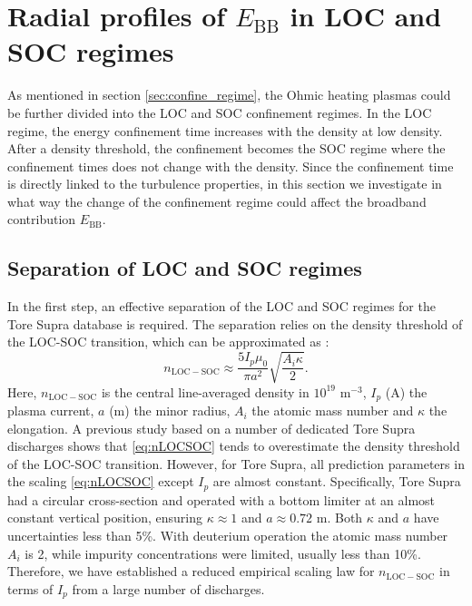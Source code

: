 \section{Radial profiles of $E_\mathrm{BB}$ in LOC and SOC regimes} \label{sec:EBB_LOC_SOC}


As mentioned in section \ref{sec:confine_regime}, the Ohmic heating plasmas could be further divided into the LOC and SOC confinement regimes. In the LOC regime, the energy confinement time increases with the density at low density. After a density threshold, the confinement becomes the SOC regime where the confinement times does not change with the density. Since the confinement time is directly linked to the turbulence properties, in this section we investigate in what way the change of the confinement regime could affect the broadband contribution $E_\mathrm{BB}$.


\subsection{Separation of LOC and SOC regimes}

In the first step, an effective separation of the LOC and SOC regimes for the Tore Supra database is required. The separation relies on the density threshold of the LOC-SOC transition, which can be approximated as \cite{shimomura_LOC_SOC_transition_1985}:%
\begin{equation}\label{eq:nLOCSOC}
n_\mathrm{LOC-SOC} \approx \frac{5I_p\mu_0}{{\pi}a^2}\sqrt{\frac{A_i\kappa}{2}}.
\end{equation}
\noindent Here, $n_\mathrm{LOC-SOC}$ is the central line-averaged density in $10^{19}$ m$^{-3}$, $I_p$ (A) the plasma current, $a$ (m) the minor radius, $A_i$ the atomic mass number and $\kappa$ the elongation. A previous study based on a number of dedicated Tore Supra discharges \cite{Arnichand_2014_NF} shows that \eqref{eq:nLOCSOC} tends to overestimate the density threshold of the LOC-SOC transition. However, for Tore Supra, all prediction parameters in the scaling \eqref{eq:nLOCSOC} except $I_p$ are almost constant. Specifically, Tore Supra had a circular cross-section and operated with a bottom limiter at an almost constant vertical position, ensuring $\kappa\approx 1$ and $a\approx 0.72$ m. Both $\kappa$ and $a$ have uncertainties less than 5\%. With deuterium operation the atomic mass number $A_i$ is 2, while impurity concentrations were limited, usually less than 10\%. Therefore, we have established a reduced empirical scaling law for $n_\mathrm{LOC-SOC}$ in terms of $I_p$ from a large number of discharges.


